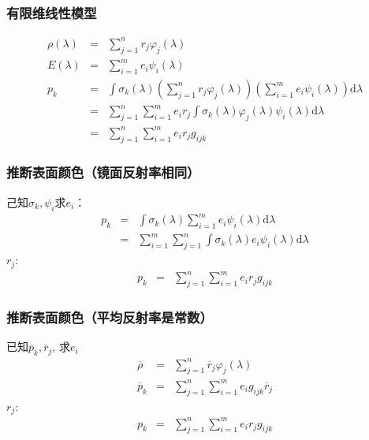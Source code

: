 \documentclass{beamer}
\newcommand{\mathd}{\mathrm{d}}
\newcommand{\nospace}{}
\begin{document}
{{\qquad{}}{\begin{frame}
  \frametitle{有限维线性模型}
  \begin{eqnarray*}
    \rho (\lambda) & = & \sum_{j = 1}^n r_j \varphi_j (\lambda)\\
    E (\lambda) & = & \sum_{i = 1}^m e_i \psi_i (\lambda)\\
    p_k & = & \int \sigma_k (\lambda) \left( \sum_{j = 1}^n r_j \varphi_j
    (\lambda) \right) \left( \sum_{i = 1}^m e_i \psi_i (\lambda) \right)
    \mathd \lambda\\
    & = & \sum_{j = 1}^n \sum_{i = 1}^m e_i r_j \int \sigma_k (\lambda)
    \varphi_j (\lambda) \psi_i (\lambda) \mathd \lambda\\
    & = & \sum_{j = 1}^n \sum_{i = 1}^m e_i r_j g_{i \nospace j \nospace k}
  \end{eqnarray*}
\end{frame}}{\begin{frame}
  \frametitle{推断表面颜色（镜面反射率相同）}
  
  己知$\sigma_k, \psi_i$求$e_i$：
  \begin{eqnarray*}
    p_k & = & \int \sigma_k (\lambda) \sum_{i = 1}^m e_i \psi_i (\lambda)
    \mathd \lambda\\
    & = & \sum_{i = 1}^m \sum_{j = 1}^n \int \sigma_k (\lambda) e_i \psi_i
    (\lambda) \mathd \lambda
  \end{eqnarray*}
  $r_j$:
  \begin{eqnarray*}
    p_k & = & \sum_{j = 1}^n \sum_{i = 1}^m e_i r_j g_{i \nospace j \nospace
    k}
  \end{eqnarray*}
\end{frame}}{\begin{frame}
  \frametitle{推断表面颜色（平均反射率是常数）}
  
  已知$\overline{p}_k, \overline{r}_j$, 求$e_i$
  \begin{eqnarray*}
    \overline{\rho} & = & \sum_{j = 1}^n \overline{r}_j \varphi_j (\lambda)\\
    \overline{p}_k & = & \sum_{j = 1}^n \sum_{i = 1}^m e_i g_{i \nospace j
    \nospace k} \overline{r}_j
  \end{eqnarray*}
  $r_j$:
  \begin{eqnarray*}
    p_k & = & \sum_{j = 1}^n \sum_{i = 1}^m e_i r_j g_{i \nospace j \nospace
    k}
  \end{eqnarray*}
\end{frame}}}
\end{document}

